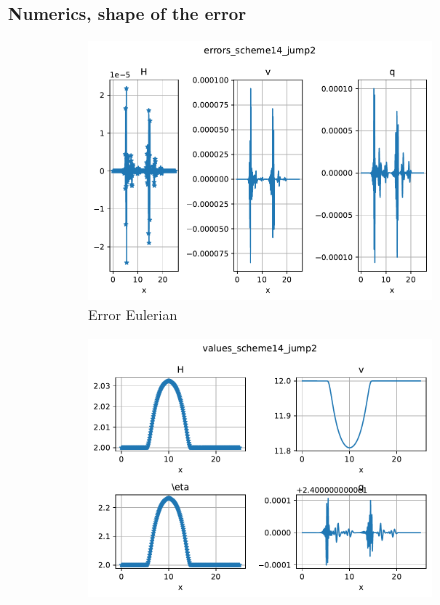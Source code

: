 \documentclass[pt12]{beamer}
\begin{document}
\begin{frame}
\frametitle{Numerics, shape of the error}

\vspace{-0.4cm}

\begin{figure}
     \centering
     \begin{subfigure}[b]{0.39\textwidth}
         \centering
         \includegraphics[width=\textwidth]{figures/debug/sup/error_eul.pdf}
         \caption{Error Eulerian}
     \end{subfigure}
     \begin{subfigure}[b]{0.39\textwidth}
         \centering
         \includegraphics[width=\textwidth]{figures/debug/sup/values_eul.pdf}

\end{subfigure}
\end{figure}
\end{frame}
\end{document}
